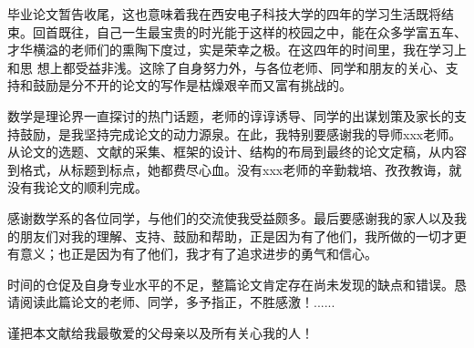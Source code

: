 \begin{thanks}

毕业论文暂告收尾，这也意味着我在西安电子科技大学的四年的学习生活既将结束。回首既往，自己一生最宝贵的时光能于这样的校园之中，能在众多学富五车、才华横溢的老师们的熏陶下度过，实是荣幸之极。在这四年的时间里，我在学习上和思
想上都受益非浅。这除了自身努力外，与各位老师、同学和朋友的关心、支持和鼓励是分不开的论文的写作是枯燥艰辛而又富有挑战的。

数学是理论界一直探讨的热门话题，老师的谆谆诱导、同学的出谋划策及家长的支持鼓励，是我坚持完成论文的动力源泉。在此，我特别要感谢我的导师xxx老师。从论文的选题、文献的采集、框架的设计、结构的布局到最终的论文定稿，从内容到格式，从标题到标点，她都费尽心血。没有xxx老师的辛勤栽培、孜孜教诲，就没有我论文的顺利完成。

感谢数学系的各位同学，与他们的交流使我受益颇多。最后要感谢我的家人以及我的朋友们对我的理解、支持、鼓励和帮助，正是因为有了他们，我所做的一切才更有意义；也正是因为有了他们，我才有了追求进步的勇气和信心。

时间的仓促及自身专业水平的不足，整篇论文肯定存在尚未发现的缺点和错误。恳请阅读此篇论文的老师、同学，多予指正，不胜感激！......

\vskip 18pt

谨把本文献给我最敬爱的父母亲以及所有关心我的人！

\end{thanks}
